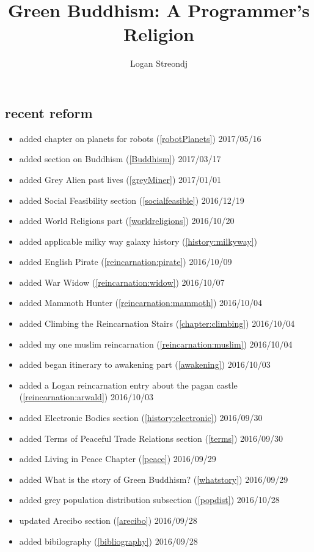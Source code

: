 \documentclass[10pt]{report}
\title{Green Buddhism: A Programmer's Religion}
\author{Logan Streondj \\
  \doclicenseName}
\begin{document}
\begin{titlepage}
\maketitle

\section{recent reform}
\begin{itemize}
  \item added chapter on planets for robots (\ref{robotPlanets}) 2017/05/16
  \item added section on Buddhism (\ref{Buddhism}) 2017/03/17
  \item added Grey Alien past lives (\ref{greyMiner}) 2017/01/01
  \item added Social Feasibility section (\ref{socialfeasible}) 2016/12/19
  \item added World Religions part (\ref{worldreligions}) 2016/10/20
  \item added applicable milky way galaxy history (\ref{history:milkyway})
  \item added English Pirate (\ref{reincarnation:pirate}) 2016/10/09
  \item added War Widow (\ref{reincarnation:widow}) 2016/10/07
  \item added Mammoth Hunter (\ref{reincarnation:mammoth}) 2016/10/04
  \item added Climbing the Reincarnation Stairs (\ref{chapter:climbing})
2016/10/04
  \item added my one muslim reincarnation (\ref{reincarnation:muslim})
2016/10/04
  \item added began itinerary to awakening part (\ref{awakening}) 2016/10/03
  \item added a Logan reincarnation entry about the pagan castle
(\ref{reincarnation:arwald}) 2016/10/03
  \item added Electronic Bodies section (\ref{history:electronic}) 2016/09/30
  \item added Terms of Peaceful Trade Relations section (\ref{terms}) 2016/09/30
  \item added Living in Peace Chapter (\ref{peace}) 2016/09/29
  \item added What is the story of Green Buddhism? (\ref{whatstory}) 2016/09/29
  \item added grey population distribution subsection (\ref{popdist})
2016/10/28
 \item updated Arecibo section (\ref{arecibo}) 2016/09/28
 \item added bibilography (\ref{bibliography}) 2016/09/28
\end{itemize}
\end{titlepage}
\tableofcontents
 





\printbibliography{}\label{bibliography}
\end{document}
